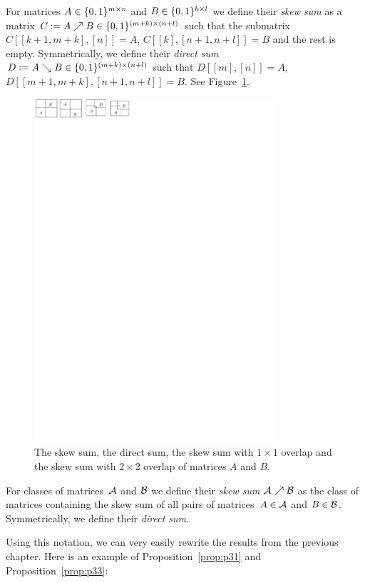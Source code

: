 \begin{defn}
For matrices $A\in\{0,1\}^{m\times n}$ and $B\in\{0,1\}^{k\times l}$ we define their \emph{skew sum} as a matrix $C:=A\nearrow B\in\{0,1\}^{(m+k)\times(n+l)}$ such that the submatrix~$C[[k+1,m+k],[n]]=A$, $C[[k],[n+1,n+l]]=B$ and the rest is empty. Symmetrically, we define their \emph{direct sum} $D:=A\searrow B\in\{0,1\}^{(m+k)\times(n+l)}$ such that $D[[m],[n]]=A$, $D[[m+1,m+k],[n+1,n+l]]=B$. See Figure~\ref{fig:skew}.
\end{defn}

\begin{figure}[!ht]
\centering
\includegraphics[width=90mm]{img/skew.pdf}
\caption{The skew sum, the direct sum, the skew sum with $1\times1$ overlap and the skew sum with $2\times2$ overlap of matrices $A$ and $B$.}
\label{fig:skew}
\end{figure}

\begin{defn}
For classes of matrices~$\mathcal{A}$ and $\mathcal{B}$ we define their \emph{skew sum} $\mathcal{A}\nearrow\mathcal{B}$ as the class of matrices containing the skew sum of all pairs of matrices~$A\in\mathcal{A}$ and $B\in\mathcal{B}$. Symmetrically, we define their \emph{direct sum}.
\end{defn}

Using this notation, we can very easily rewrite the results from the previous chapter. Here is an example of Proposition~\ref{prop:p31} and Proposition~\ref{prop:p33}:

